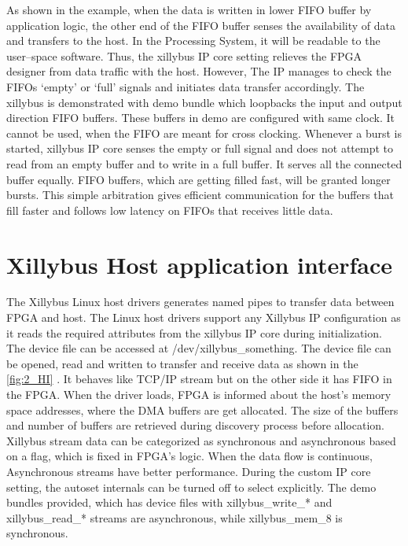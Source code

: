 As shown in the example, when the data is written in lower FIFO buffer by application logic, the other end of the FIFO buffer senses the availability of data and transfers to the host. In the Processing System, it will be readable to the user--space software. Thus, the xillybus IP core setting relieves the FPGA designer from data traffic with the host. However, The IP manages to check the FIFOs ‘empty’ or ‘full’ signals and initiates data transfer accordingly. The xillybus is demonstrated with demo bundle which loopbacks the input and output direction FIFO buffers. These buffers in demo are configured with same clock. It cannot be used, when the FIFO are meant for cross clocking. Whenever a burst is started, xillybus IP core senses the empty or full signal and does not attempt to read from an empty buffer and to write in a full buffer. It serves all the connected buffer equally. FIFO buffers, which are getting filled fast, will be granted longer bursts. This simple arbitration gives efficient communication for the buffers that fill faster and follows low latency on FIFOs that receives little data.

\section{Xillybus Host application interface}

The Xillybus Linux host drivers generates named pipes to transfer data between FPGA and host. The Linux host drivers support any Xillybus IP configuration as it reads the required attributes from the xillybus IP core during initialization. The device file can be accessed at /dev/xillybus\_something. The device file can be opened, read and written to transfer and receive data as shown in the \ref{fig:2_HI} \cite{23}. It behaves like TCP/IP stream but on the other side it has FIFO in the FPGA. When the driver loads, FPGA is informed about the host's memory space addresses, where the DMA buffers are get allocated. The size of the buffers and number of buffers are retrieved during discovery process before allocation. Xillybus stream data can be categorized as synchronous and asynchronous based on a flag, which is fixed in FPGA’s logic. When the data flow is continuous, Asynchronous streams have better performance. During the custom IP core setting, the autoset internals can be turned off to select explicitly. The demo bundles provided, which has device files with xillybus\_write\_* and xillybus\_read\_* streams are asynchronous, while xillybus\_mem\_8 is synchronous.


